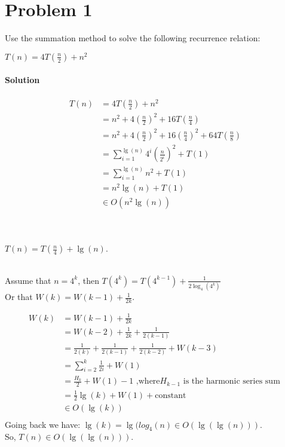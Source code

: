\documentclass[12pt]{article}
\begin{document}
\maketitle


\section{Problem 1}
Use the summation method to solve the following recurrence relation: \\
\centerline{$ T(n) = 4T( \frac{n}{2} ) + n^{2} $}

\paragraph{Solution}

 \begin{align*}
 T(n)  & = 4T( \frac{n}{2} ) + n^{2}  \\
          & =  n^{2} + 4( \frac{n}{2} )^{2} + 16 T(\frac{n}{4} ) \\
          & =  n^{2} + 4( \frac{n}{2} )^{2} + 16 (\frac{n}{4})^{2} + 64 T(\frac{n}{8}) \\
          & = \sum_{i = 1}^{\lg(n)} 4^{i}( \frac{n}{2^{i}} )^{2} + T(1) \\
          & = \sum_{i = 1}^{\lg(n)} n^{2} +T(1) \\
          & = n^2\lg(n) + T(1) \\
          & \in O(n^{2}\lg(n)) \\
\end{align*}

\hrulefill \\
\centerline{$T(n) = T(\frac{n}{4}) + \lg(n)$.}\\

Assume that $n = 4^k$, then $T(4^k) = T(4^{k-1}) + \frac{1}{2 \log_4(4^k)}$\\
Or that $W(k) = W(k-1) + \frac{1}{2k}$.

 \begin{align*}
W(k)  & =W(k-1) + \frac{1}{2k} \\
          & = W(k-2) +\frac{1}{2k} +\frac{1}{2(k-1)} \\
          & = \frac{1}{2(k)} + \frac{1}{2(k-1)} + \frac{1}{2(k-2)} +W(k-3) \\
          & = \sum_{i = 2}^{k} \frac{1}{2i} +W(1)\\
          & = \frac{H_{k}}{2} +W(1)  - 1  \text{ ,where$H_{k-1}$ is the harmonic series sum}\ \\
          & = \frac{1}{2}\lg(k) +W(1) + \text{constant}\ \\
          & \in O(\lg(k))\\
\end{align*}
Going back we have: $\lg(k) = \lg( log_4(n) \in O(\lg( \lg(n)))$.
\\
So, $T(n) \in O( \lg (\lg(n)))$.
\end{document}
